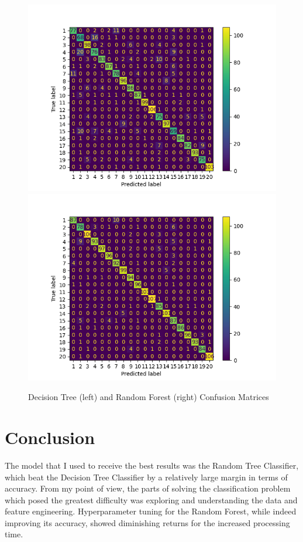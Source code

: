 \documentclass{article}
\begin{document}
\begin{figure}[hbt!]
	\centering
	\includegraphics[scale=0.45]{conf_matrix_dt.png}
	\includegraphics[scale=0.45]{conf_matrix_rfc.png}
	\caption{Decision Tree (left) and Random Forest (right) Confusion Matrices}
\end{figure}

\newpage

\section{Conclusion}
The model that I used to receive the best results was the Random Tree Classifier, which beat the Decision Tree Classifier by a relatively large margin in terms of accuracy. From my point of view, the parts of solving the classification problem which posed the greatest difficulty was exploring and understanding the data and feature engineering. Hyperparameter tuning for the Random Forest, while indeed improving its accuracy, showed diminishing returns for the increased processing time.   
\end{document}
